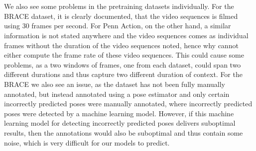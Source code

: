 \documentclass[./main.tex]{subfiles}
\begin{document}
\\
\\
We also see some problems in the pretraining datasets individually. For the BRACE dataset, it is clearly documented, that the video sequences is filmed using 30 frames per second. For Penn Action, on the other hand, a similar information is not stated anywhere and the video sequences comes as individual frames without the duration of the video sequences noted, hence why cannot either compute the frame rate of these video sequences. This could cause some problems, as a two windows of frames, one from each dataset, could span two different durations and thus capture two different duration of context. For the BRACE we also see an issue, as the dataset has not been fully manually annotated, but instead annotated using a pose estimator and only certain incorrectly predicted poses were manually annotated, where incorrectly predicted poses were detected by a machine learning model. However, if this machine learning model for detecting incorrectly predicted poses delivers suboptimal results, then the annotations would also be suboptimal and thus contain some noise, which is very difficult for our models to predict.
\end{document}
